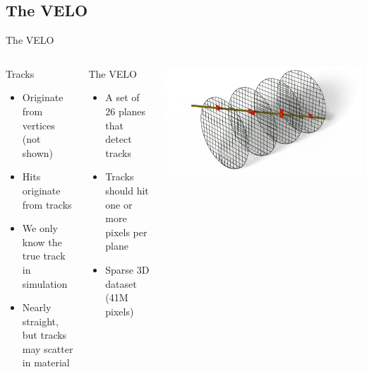 \subsection{The VELO}
\begin{frame}{The VELO}
  \begin{columns}[c]
    \begin{block}{Tracks}
      \begin{itemize}
          \item Originate from vertices (not shown)
          \item Hits originate from tracks
          \item We only know the true track in simulation
          \item Nearly straight, but tracks may scatter in material
      \end{itemize}
    \end{block}
    \begin{block}{The VELO}
      \begin{itemize}
          \item A set of 26 planes that detect tracks
          \item Tracks should hit one or more pixels per plane
          \item Sparse 3D dataset (41M pixels)
      \end{itemize}
    \end{block}
    \centering
    \includegraphics[width=\textwidth, trim=200 0 100 0]{images/Intersections.png}
  \end{columns}
\end{frame}
